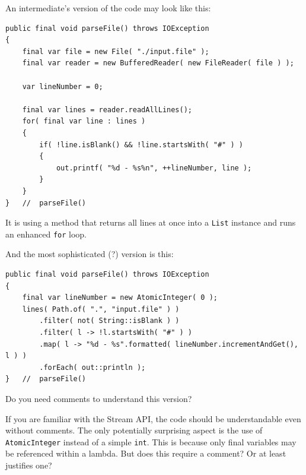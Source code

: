 An intermediate's version of the code may look like this:
\begin{lstlisting}
public final void parseFile() throws IOException
{
    final var file = new File( "./input.file" );
    final var reader = new BufferedReader( new FileReader( file ) );

    var lineNumber = 0;

    final var lines = reader.readAllLines();
    for( final var line : lines )
    {
        if( !line.isBlank() && !line.startsWith( "#" ) )
        {
            out.printf( "%d - %s%n", ++lineNumber, line );
        }
    }
}   //  parseFile()  
\end{lstlisting}

It is using a method that returns all lines at once into a \lstinline|List| instance and runs an enhanced \lstinline|for| loop.

And the most sophisticated (?) version is this:
\begin{lstlisting}
public final void parseFile() throws IOException
{
    final var lineNumber = new AtomicInteger( 0 );
    lines( Path.of( ".", "input.file" ) )
        .filter( not( String::isBlank ) )
        .filter( l -> !l.startsWith( "#" ) )
        .map( l -> "%d - %s".formatted( lineNumber.incrementAndGet(), l ) )
        .forEach( out::println );
}   //  parseFile()  
\end{lstlisting}

Do you need comments to understand this version?

If you are familiar with the Stream API, the code should be understandable even without comments. The only potentially surprising aspect is the use of \lstinline|AtomicInteger| instead of a simple \lstinline|int|. This is because only final variables may be referenced within a lambda. But does this require a comment? Or at least justifies one?

